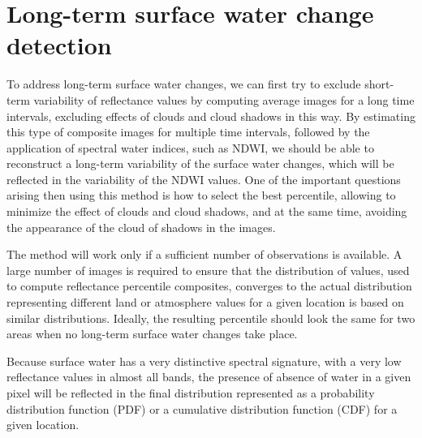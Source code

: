 \section{Long-term surface water change detection}

To address long-term surface water changes, we can first try to exclude short-term variability of reflectance values by computing average images for a long time intervals, excluding effects of clouds and cloud shadows in this way. By estimating this type of composite images for multiple time intervals, followed by the application of spectral water indices, such as NDWI, we should be able to reconstruct a long-term variability of the surface water changes, which will be reflected in the variability of the NDWI values. One of the important questions arising then using this method is how to select the best percentile, allowing to minimize the effect of clouds and cloud shadows, and at the same time, avoiding the appearance of the cloud of shadows in the images. 

The method will work only if a sufficient number of observations is available. A large number of images is required to ensure that the distribution of values, used to compute reflectance percentile composites, converges to the actual distribution representing different land or atmosphere values for a given location  is based on similar distributions. Ideally, the resulting percentile should look the same for two areas when no long-term surface water changes take place. 

Because surface water has a very distinctive spectral signature, with a very low reflectance values in almost all bands, the presence of absence of water in a given pixel will be reflected in the final distribution represented as a probability distribution function (PDF) or a cumulative distribution function (CDF) for a given location.


